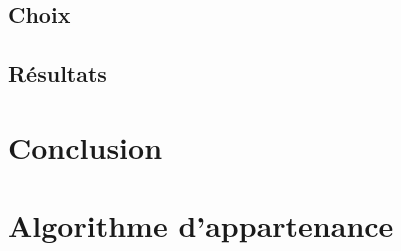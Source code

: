 	\section{Choix}\label{sec:choix}
	\section{Résultats}\label{sec:res}

	\chapter{Conclusion}\label{ch:ccl}


	\newpage
	
	

	\appendix
	\chapter{Algorithme d'appartenance}\label{app:membership}




